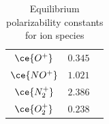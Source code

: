 \begin{table}[H]
\begin{minipage}[b]{0.49\textwidth}
\begin{tabular}{| c | c | c |}
                    $\ce{O^+}$   & $0.345$                               &\cite{Stewart1975}\\
                    $\ce{NO^+}$  & $1.021$                               &\cite{Feher1993}\\
                    $\ce{N_2^+}$ & $2.386$                               &\cite{McCormack1991}\\
                    $\ce{O_2^+}$ & $0.238$                               &\cite{Stewart1975}\\
                    \hline 
                \end{tabular}
                \caption{Equilibrium polarizability constants for ion species\label{tab:equilibriumPolarizabilityIonSpecies}}
           \end{minipage}
    \end{table}
